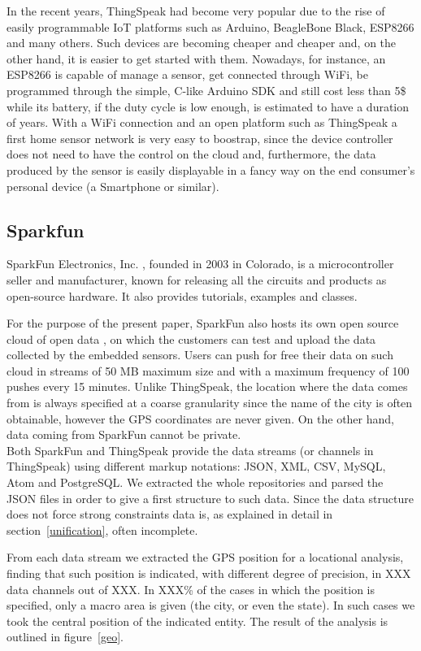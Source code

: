 \documentclass[conference]{IEEEtran}
\begin{document}
In the recent years, ThingSpeak had become very popular due to the rise of easily programmable IoT platforms such as Arduino, BeagleBone Black, ESP8266 and many others.
Such devices are becoming cheaper and cheaper and, on the other hand, it is easier to get started with them.
Nowadays, for instance, an ESP8266 is capable of manage a sensor, get connected through WiFi, be programmed through the simple, C-like Arduino SDK and still cost less than 5\$ while its battery, if the duty cycle is low enough, is estimated to have a duration of years.
With a WiFi connection and an open platform such as ThingSpeak a first home sensor network is very easy to boostrap, since the device controller does not need to have the control on the cloud and, furthermore, the data produced by the sensor is easily displayable in a fancy way on the end consumer's personal device (a Smartphone or similar).

\subsection*{Sparkfun}
SparkFun Electronics, Inc. \cite{sparkfun}, founded in 2003 in Colorado, is a microcontroller seller and manufacturer, known for releasing all the circuits and products as open-source hardware.
It also provides tutorials, examples and classes.

For the purpose of the present paper, SparkFun also hosts its own open source cloud of open data \cite{sparkfundata}, on which the customers can test and upload the data collected by the embedded sensors.
Users can push for free their data on such cloud in streams of 50 MB maximum size and with a maximum frequency of 100 pushes every 15 minutes.
Unlike ThingSpeak, the location where the data comes from is always specified at a coarse granularity since the name of the city is often obtainable, however the GPS coordinates are never given.
On the other hand, data coming from SparkFun cannot be private.
\\

Both SparkFun and ThingSpeak provide the data streams (or channels in ThingSpeak) using different markup notations: JSON, XML, CSV, MySQL, Atom and PostgreSQL.
We extracted the whole repositories and parsed the JSON files in order to give a first structure to such data.
Since the data structure does not force strong constraints data is, as explained in detail in section~\ref{unification}, often incomplete.

From each data stream we extracted the GPS position for a locational analysis, finding that such position is indicated, with different degree of precision, in XXX data channels out of XXX.
In XXX\% of the cases in which the position is specified, only a macro area is given (the city, or even the state).
In such cases we took the central position of the indicated entity.
The result of the analysis is outlined in figure~\ref{geo}.
\end{document}
